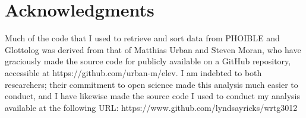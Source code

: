 \documentclass{article}
\begin{document}
\section{Acknowledgments}

Much of the code that I used to retrieve and sort data from PHOIBLE and Glottolog was derived from that of Matthias Urban and Steven Moran, who have graciously made the source code for \textcite{urban2021} publicly available on a GitHub repository, accessible at https://github.com/urban-m/elev. I am indebted to both researchers; their commitment to open science made this analysis much easier to conduct, and I have likewise made the source code I used to conduct my analysis available at the following URL: https://www.github.com/lyndsayricks/wrtg3012

\pagebreak

\printbibliography

\pagebreak
\end{document}

